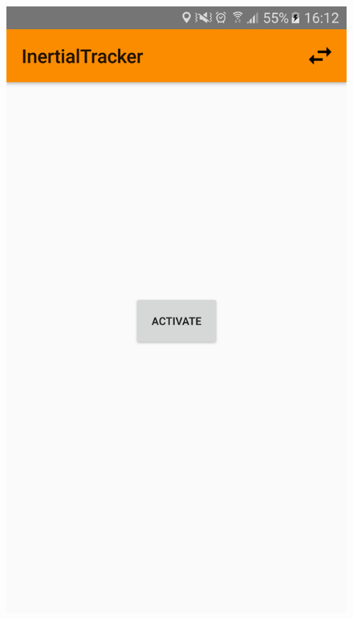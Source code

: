 \documentclass[12pt,a4paper,openright,twoside]{report}
\begin{document}
\begin{figure}[h!]
\centering 
\includegraphics[scale=0.1]{TestActivity} 

\end{figure}
\end{document}
